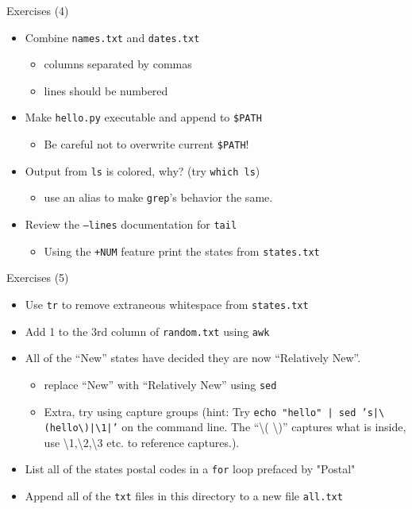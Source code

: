 \documentclass[hyperref={pdfpagelabels=false},12pt]{beamer}
\begin{document}
\begin{frame}[label=exercises-4]{Exercises (4)}
    \begin{itemize}
        \item Combine \texttt{names.txt} and \texttt{dates.txt}
        \begin{itemize}
            \item columns separated by commas
            \item lines should be numbered
        \end{itemize}
        \item Make \texttt{hello.py} executable and append to \texttt{\$PATH}
        \begin{itemize}
            \item Be careful not to overwrite current \texttt{\$PATH}!
        \end{itemize}
        \item Output from \texttt{ls} is colored, why? (try \texttt{which ls})
        \begin{itemize}
            \item use an alias to make \texttt{grep}'s behavior the same.
        \end{itemize}
        \item Review the \texttt{--lines} documentation for \texttt{tail}
        \begin{itemize}
            \item Using the \texttt{+NUM} feature print the states from \texttt{states.txt}
        \end{itemize}
    \end{itemize}
\end{frame}

\begin{frame}[label=exercises-5]{Exercises (5)}
\begin{itemize}
    \item Use \texttt{tr} to remove extraneous whitespace from \texttt{states.txt}
    \item Add 1 to the 3rd column of \texttt{random.txt} using \texttt{awk}
    \item All of the ``New'' states have decided they are now ``Relatively New''.
    \begin{itemize}
        \item replace ``New'' with ``Relatively New'' using \texttt{sed} 
        \item Extra, try using capture groups (hint: Try \texttt{echo "hello" |
        sed 's|\textbackslash(hello\textbackslash)|\textbackslash1|'} on the
        command line. The ``\textbackslash( \textbackslash)'' captures what is
        inside, use \textbackslash1,\textbackslash2,\textbackslash3 etc. to
        reference captures.).
    \end{itemize}
    \item List all of the states postal codes in a \texttt{for} loop prefaced by "Postal"
    \item Append all of the \texttt{txt} files in this directory to a new file \texttt{all.txt}
\end{itemize}
\end{frame}
\end{document}

